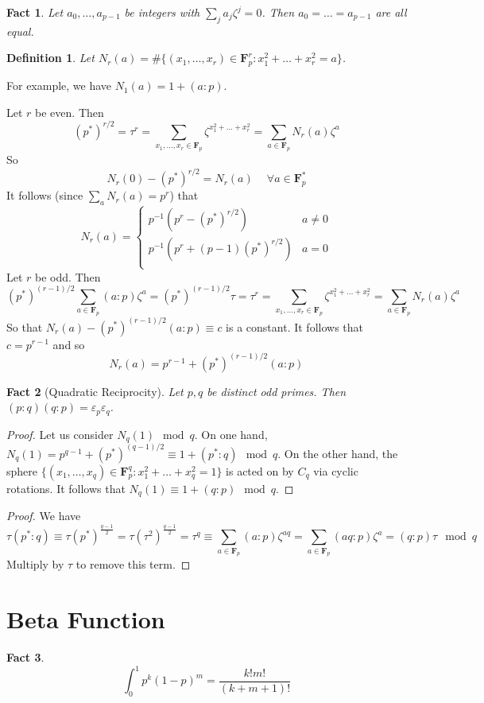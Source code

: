 \documentclass[12pt]{article}
\newtheorem*{fact*}{Fact}
\newtheorem{defn}{Definition}
\newcommand{\eps}{\varepsilon}
\newcommand{\F}{\mathbf{F}}
\begin{document}
\begin{fact*}
Let $a_0,\dots,a_{p-1}$ be integers with $\sum_{j}a_j\zeta^j = 0$. Then $a_0=\dots=a_{p-1}$ are all equal.
\end{fact*}


\begin{defn}
Let $N_r(a) = \#\{(x_1,\dots,x_r)\in\F_p^r : x_1^2+\dots+x_r^2=a\}$.
\end{defn}


For example, we have $N_1(a)=1+(a:p)$.


Let $r$ be even. Then 
\[(p^*)^{r/2}=\tau^r = \sum_{x_1,\dots,x_r\in\F_p}\zeta^{x_1^2+\dots+x_r^2} = \sum_{a\in\F_p}N_r(a)\zeta^{a}\]
So
\[N_r(0)-(p^*)^{r/2} = N_r(a) \phantom{-} \forall a\in\F_p^*\]
It follows (since $\sum_a N_r(a)=p^r$) that
\[N_r(a) = \begin{cases}
    p^{-1}(p^r-(p^*)^{r/2}) & a\neq 0 \\
    p^{-1}(p^r+(p-1)(p^*)^{r/2}) & a = 0 \\
\end{cases}\]
Let $r$ be odd. Then
\[(p^*)^{(r-1)/2}\sum_{a\in\F_p}(a:p)\zeta^{a}=(p^*)^{(r-1)/2}\tau=\tau^r = \sum_{x_1,\dots,x_r\in\F_p}\zeta^{x_1^2+\dots+x_r^2} = \sum_{a\in\F_p}N_r(a)\zeta^{a}\]
So that $N_r(a) - (p^*)^{(r-1)/2}(a:p) \equiv c$ is a constant. It follows that $c=p^{r-1}$ and so
\[
N_r(a) = p^{r-1} + (p^*)^{(r-1)/2}(a:p)
\]


\begin{fact*}[Quadratic Reciprocity]
Let $p,q$ be distinct odd primes. Then $(p:q)(q:p)=\eps_p\eps_q$.
\end{fact*}


\begin{proof}
Let us consider $N_q(1) \mod q$. On one hand, $N_q(1)=p^{q-1} + (p^*)^{(q-1)/2} \equiv 1 + (p^*:q) \mod q$. On the other hand, the sphere $\{(x_1,\dots,x_q)\in\F_p^q : x_1^2+\dots+x_q^2=1\}$ is acted on by $C_q$ via cyclic rotations. It follows that $N_q(1) \equiv 1 + (q:p) \mod q$.
\end{proof}


\begin{proof}
We have 
\[\tau (p^*:q) \equiv \tau (p^*)^{\frac{q-1}{2}}=\tau (\tau^2)^{\frac{q-1}{2}}=\tau^q \equiv \sum_{a\in\F_p} (a:p)\zeta^{aq}=
\sum_{a\in\F_p} (aq:p)\zeta^{a}=(q:p)\tau \mod q\]
Multiply by $\tau$ to remove this term.
\end{proof}


\newpage
\section{Beta Function}
\begin{fact*}
\[\int_0^1 p^k (1-p)^m = \dfrac{k!m!}{(k+m+1)!}\]
\end{fact*}
\end{document}
